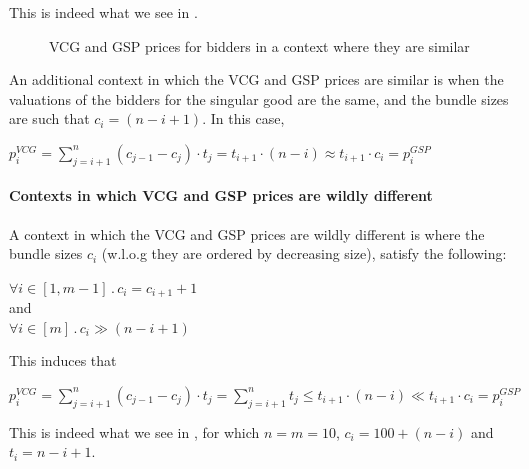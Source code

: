 \documentclass{article}
\begin{document}
\begin{enumerate}[label=(\alph*)]
    \noindent
    This is indeed what we see in .

    \FloatBarrier

    \begin{figure}[H]
        \centering
        \resizebox{0.5\textwidth}{!}{}
        \caption{VCG and GSP prices for bidders in a context where they are similar}
        \label{fig:b2b_similar}
    \end{figure}

    \FloatBarrier

    An additional context in which the VCG and GSP prices are similar is when the valuations of the bidders for the singular good are the same, and the bundle sizes are such that $c_i = (n - i + 1)$. In this case, 
    
    \begin{center}
        $p^{VCG}_i = \sum_{j=i+1}^{n} \left( c_{j-1} - c_j \right) \cdot t_j = t_{i+1} \cdot (n - i) \approx t_{i+1} \cdot c_i = p^{GSP}_i$
    \end{center}

    \paragraph{Contexts in which VCG and GSP prices are wildly different}
    A context in which the VCG and GSP prices are wildly different is where the bundle sizes $c_i$ (w.l.o.g they are ordered by decreasing size), satisfy the following:

    \begin{center}
        $\forall i \in [1, m-1] \, . \, c_i = c_{i+1} + 1$ \\
        and \\ 
        $\forall i \in [m] \, . \, c_i \gg (n - i + 1)$
    \end{center}
    
    This induces that 
    
    \begin{center}
        $p^{VCG}_i = \sum_{j=i+1}^{n} \left( c_{j-1} - c_j \right) \cdot t_j = \sum_{j=i+1}^{n} t_j \leq t_{i+1} \cdot (n - i) \ll t_{i+1} \cdot c_i = p^{GSP}_i$
    \end{center}
        
    This is indeed what we see in , for which $n = m = 10$, $c_i = 100 + (n - i)$ and $t_i = n - i + 1$.

    \FloatBarrier


\end{enumerate}
\end{document}
